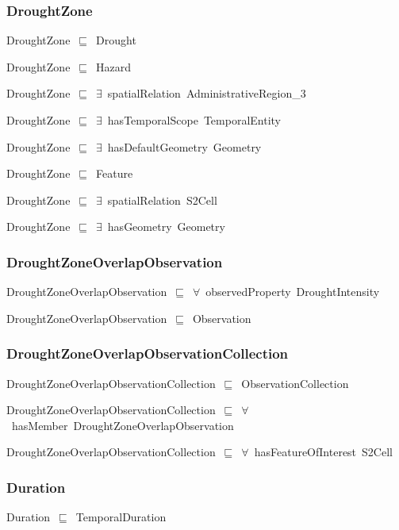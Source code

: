 \documentclass{article}
\begin{document}
\subsubsection*{DroughtZone}

DroughtZone~\ensuremath{\sqsubseteq}~Drought~

DroughtZone~\ensuremath{\sqsubseteq}~Hazard~

DroughtZone~\ensuremath{\sqsubseteq}~\ensuremath{\exists}~spatialRelation~AdministrativeRegion\_3~

DroughtZone~\ensuremath{\sqsubseteq}~\ensuremath{\exists}~hasTemporalScope~TemporalEntity~

DroughtZone~\ensuremath{\sqsubseteq}~\ensuremath{\exists}~hasDefaultGeometry~Geometry~

DroughtZone~\ensuremath{\sqsubseteq}~Feature~

DroughtZone~\ensuremath{\sqsubseteq}~\ensuremath{\exists}~spatialRelation~S2Cell~

DroughtZone~\ensuremath{\sqsubseteq}~\ensuremath{\exists}~hasGeometry~Geometry~

\subsubsection*{DroughtZoneOverlapObservation}

DroughtZoneOverlapObservation~\ensuremath{\sqsubseteq}~\ensuremath{\forall}~observedProperty~DroughtIntensity~

DroughtZoneOverlapObservation~\ensuremath{\sqsubseteq}~Observation~

\subsubsection*{DroughtZoneOverlapObservationCollection}

DroughtZoneOverlapObservationCollection~\ensuremath{\sqsubseteq}~ObservationCollection~

DroughtZoneOverlapObservationCollection~\ensuremath{\sqsubseteq}~\ensuremath{\forall}~hasMember~DroughtZoneOverlapObservation~

DroughtZoneOverlapObservationCollection~\ensuremath{\sqsubseteq}~\ensuremath{\forall}~hasFeatureOfInterest~S2Cell~

\subsubsection*{Duration}

Duration~\ensuremath{\sqsubseteq}~TemporalDuration~
\end{document}
